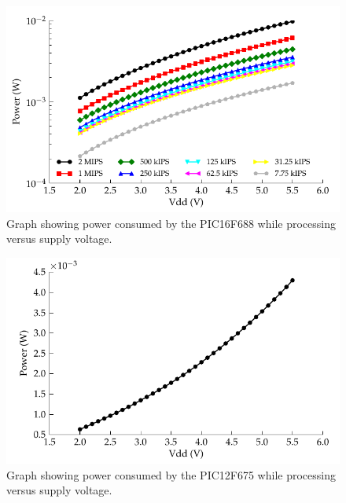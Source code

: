       \begin{figure}
        \centering
        \includegraphics{content/pt1/03-EnergyRequirements/graphics/Graph_PIC16F688_Clock_Power}
        \caption{\label{graph:CLK_POWER_16F688}Graph showing power consumed by the PIC16F688 while processing versus supply voltage.}
      \end{figure}

      \begin{figure}
      \centering
        \includegraphics{content/pt1/03-EnergyRequirements/graphics/Graph_PIC12F675_Clock_Power}
        \caption{\label{graph:CLK_POWER_12F675-1}Graph showing power consumed by the PIC12F675 while processing versus supply voltage.}
      \end{figure}

